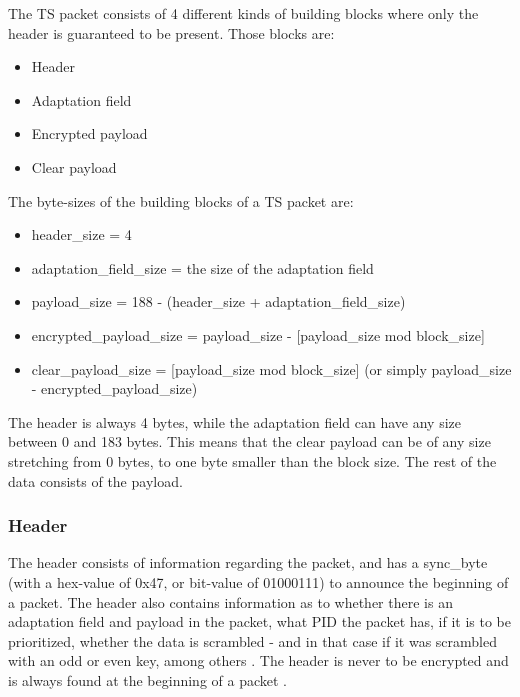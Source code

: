 The TS packet consists of 4 different kinds of building blocks where 
only the header is guaranteed to be present. Those blocks are:

\begin{itemize}
\item Header
\item Adaptation field
\item Encrypted payload
\item Clear payload
\end{itemize}

The byte-sizes of the building blocks of a TS packet are:

\begin{itemize}
\item header\_size = 4
\item adaptation\_field\_size = the size of the adaptation field
\item payload\_size = 188 - (header\_size + adaptation\_field\_size)
\item encrypted\_payload\_size = payload\_size - [payload\_size mod block\_size]
\item clear\_payload\_size = [payload\_size mod block\_size] 
  (or simply payload\_size - encrypted\_payload\_size)
\end{itemize}

The header is always 4 bytes, while the adaptation field can have any 
size between 0 and 183 bytes. This means that the clear payload can 
be of any size stretching from 0 bytes, to one byte smaller than the 
block size. The rest of the data consists of the payload.

\subsubsection{Header}
The header consists of information regarding the packet, 
and has a sync\_byte (with a hex-value of 0x47, or bit-value of 
01000111) to announce the beginning of a packet. The header also 
contains information as to whether there is an adaptation field and 
payload in the packet, what PID the packet has, if it is to be 
prioritized, whether the data is scrambled - and in that case if it 
was scrambled with an odd or even key, among others 
\citep[pp. 25--26]{etsiMPEG:2009}. The header is never to be encrypted 
and is always found at the beginning of a packet 
\citep[pp. 10--11]{DVB:2013}.

